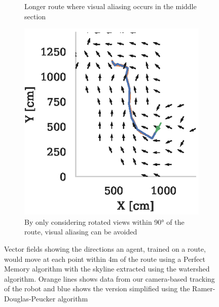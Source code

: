 \documentclass[letterpaper]{article}
\begin{document}
\begin{figure}[t]
\begin{subfigure}[t]{0.3\textwidth}
        \caption{Longer route where visual aliasing occurs in the middle section}
        \label{fig:vector_fields/route5_perfect_memory_mask}
    \end{subfigure}
    \begin{subfigure}[t]{0.3\textwidth}
        \includegraphics{figures/vector_field_route5_PerfectMemoryConstrained_mask.eps}
        \caption{By only considering rotated views within 90° of the route, visual aliasing can be avoided}
        \label{fig:vector_fields/route5_perfect_memory_constrained_mask}
    \end{subfigure}
    
    \caption{Vector fields showing the directions an agent, trained on a route, would move at each point within 4m of the route using a Perfect Memory algorithm with the skyline extracted using the watershed algorithm. 
    Orange lines shows data from our camera-based tracking of the robot and blue shows the version simplified using the Ramer-Douglas-Peucker algorithm~\citep{Ramer1972}}
    \label{fig:vector_fields}
\end{figure}
\end{document}
